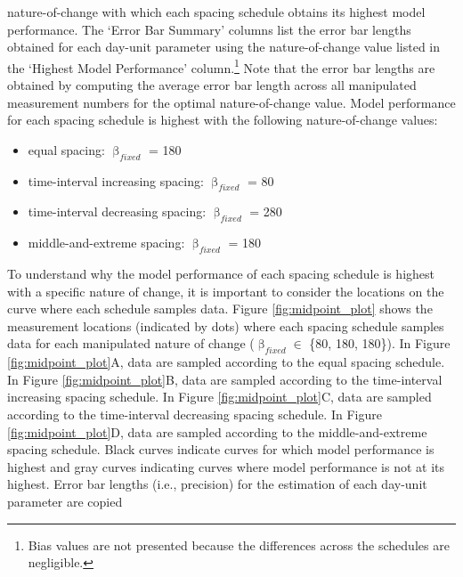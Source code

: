\documentclass[
12pt, %
twoside,
english]{guelphthesis}
\begin{document}
\noindent nature-of-change with which each spacing schedule obtains its highest model performance. The `Error Bar Summary' columns list the error bar lengths obtained for each day-unit parameter using the nature-of-change value listed in the `Highest Model Performance' column.\footnote{Bias values are not presented because the differences across the schedules are negligible.} Note that the error bar lengths are obtained by computing the average error bar length across all manipulated measurement numbers for the optimal nature-of-change value. Model performance for each spacing schedule is highest with the following nature-of-change values:
\begin{itemize}
\tightlist
\item
  equal spacing: \(\upbeta_{fixed}\) = 180
\item
  time-interval increasing spacing: \(\upbeta_{fixed}\) = 80
\item
  time-interval decreasing spacing: \(\upbeta_{fixed}\) = 280
\item
  middle-and-extreme spacing: \(\upbeta_{fixed}\) = 180
\end{itemize}
To understand why the model performance of each spacing schedule is highest with a specific nature of change, it is important to consider the locations on the curve where each schedule samples data. Figure \ref{fig:midpoint_plot} shows the measurement locations (indicated by dots) where each spacing schedule samples data for each manipulated nature of change (\(\upbeta_{fixed} \in\) \{80, 180, 180\}). In Figure \ref{fig:midpoint_plot}A, data are sampled according to the equal spacing schedule. In Figure \ref{fig:midpoint_plot}B, data are sampled according to the time-interval increasing spacing schedule. In Figure \ref{fig:midpoint_plot}C, data are sampled according to the time-interval decreasing spacing schedule. In Figure \ref{fig:midpoint_plot}D, data are sampled according to the middle-and-extreme spacing schedule. Black curves indicate curves for which model performance is highest and gray curves indicating curves where model performance is not at its highest. Error bar lengths (i.e., precision) for the estimation of each day-unit parameter are copied
\end{document}
